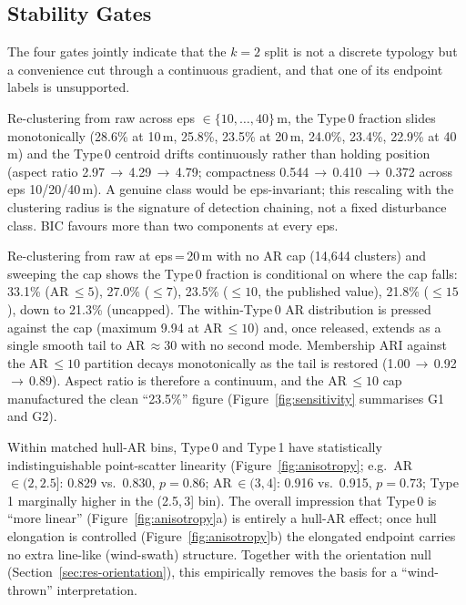 \documentclass[twocolumn]{article}
\begin{document}
\subsection{Stability Gates}
\label{sec:res-sensitivity}

The four gates jointly indicate that the $k=2$ split is not a discrete typology but a
convenience cut through a continuous gradient, and that one of its endpoint labels is
unsupported.

Re-clustering from raw across eps $\in \{10,\ldots,40\}$\,m, the Type\,0 fraction slides
monotonically (28.6\% at 10\,m, 25.8\%, 23.5\% at 20\,m, 24.0\%, 23.4\%, 22.9\% at 40\,m) and the
Type\,0 centroid drifts continuously rather than holding position (aspect ratio 2.97\,$\to$\,4.29\,$\to$\,4.79;
compactness 0.544\,$\to$\,0.410\,$\to$\,0.372 across eps 10/20/40\,m). A genuine class would be
eps-invariant; this rescaling with the clustering radius is the signature of detection chaining, not
a fixed disturbance class. BIC favours more than two components at every eps.

Re-clustering from raw at eps\,=\,20\,m with no AR cap (14,644 clusters) and sweeping the cap shows
the Type\,0 fraction is conditional on where the cap falls: 33.1\% (AR\,$\leq 5$), 27.0\% ($\leq 7$),
23.5\% ($\leq 10$, the published value), 21.8\% ($\leq 15$), down to 21.3\% (uncapped). The within-Type\,0
AR distribution is pressed against the cap (maximum 9.94 at AR\,$\leq 10$) and, once released, extends
as a single smooth tail to AR\,$\approx 30$ with no second mode. Membership ARI against the AR\,$\leq 10$
partition decays monotonically as the tail is restored (1.00\,$\to$\,0.92\,$\to$\,0.89). Aspect ratio is
therefore a continuum, and the AR\,$\leq 10$ cap manufactured the clean ``23.5\%'' figure
(Figure~\ref{fig:sensitivity} summarises G1 and G2).

Within matched hull-AR bins, Type\,0 and Type\,1 have statistically indistinguishable point-scatter
linearity (Figure~\ref{fig:anisotropy}; e.g.\ AR\,$\in(2,2.5]$: 0.829 vs.\ 0.830, $p=0.86$;
AR\,$\in(3,4]$: 0.916 vs.\ 0.915, $p=0.73$; Type\,1 marginally higher in the (2.5,\,3] bin). The
overall impression that Type\,0 is ``more linear'' (Figure~\ref{fig:anisotropy}a) is entirely a
hull-AR effect; once hull elongation is controlled (Figure~\ref{fig:anisotropy}b) the elongated
endpoint carries no extra line-like (wind-swath) structure. Together with the orientation null
(Section~\ref{sec:res-orientation}), this empirically removes the basis for a ``wind-thrown''
interpretation.
\end{document}
